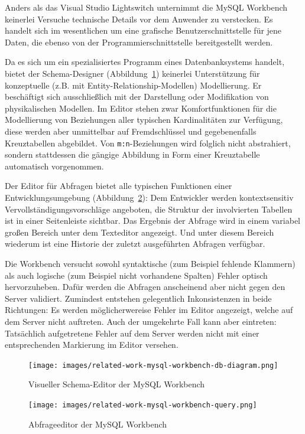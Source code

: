 Anders als das Visual Studio Lightswitch unternimmt die MySQL Workbench keinerlei Versuche technische Details vor dem Anwender zu verstecken. Es handelt sich im wesentlichen um eine grafische Benutzerschnittstelle für jene Daten, die ebenso von der Programmierschnittstelle bereitgestellt werden.

Da es sich um ein spezialisiertes Programm eines Datenbanksystems handelt, bietet der Schema-Designer (Abbildung~\ref{fig:mysql-workbench-schema-diagram}) keinerlei Unterstützung für konzeptuelle (z.B. mit Entity-Relationship-Modellen) Modellierung. Er beschäftigt sich ausschließlich mit der Darstellung oder Modifikation von physikalischen Modellen. Im Editor stehen zwar Komfortfunktionen für die Modellierung von Beziehungen aller typischen Kardinalitäten zur Verfügung, diese werden aber unmittelbar auf Fremdschlüssel und gegebenenfalls Kreuztabellen abgebildet. Von \texttt{m:n}-Beziehungen wird folglich nicht abstrahiert, sondern stattdessen die gängige Abbildung in Form einer Kreuztabelle automatisch vorgenommen.

Der Editor für Abfragen bietet alle typischen Funktionen einer Entwicklungsumgebung (Abbildung~\ref{fig:mysql-workbench-query}): Dem Entwickler werden kontextsensitiv Vervollständigungsvorschläge angeboten, die Struktur der involvierten Tabellen ist in einer Seitenleiste sichtbar. Das Ergebnis der Abfrage wird in einem variabel großen Bereich unter dem Texteditor angezeigt. Und unter diesem Bereich wiederum ist eine Historie der zuletzt ausgeführten Abfragen verfügbar.

Die Workbench versucht sowohl syntaktische (zum Beispiel fehlende Klammern) als auch logische (zum Beispiel nicht vorhandene Spalten) Fehler optisch hervorzuheben. Dafür werden die Abfragen anscheinend aber nicht gegen den Server validiert. Zumindest entstehen gelegentlich Inkonsistenzen in beide Richtungen: Es werden möglicherwereise Fehler im Editor angezeigt, welche auf dem Server nicht auftreten. Auch der umgekehrte Fall kann aber eintreten: Tatsächlich aufgetretene Fehler auf dem Server werden nicht mit einer entsprechenden Markierung im Editor versehen.

\begin{figure}[p]
  \centering \texttt{[image: images/related-work-mysql-workbench-db-diagram.png]}
  \caption{Visueller Schema-Editor der MySQL Workbench}
  \label{fig:mysql-workbench-schema-diagram}
\end{figure}

\begin{figure}[p]
  \centering \texttt{[image: images/related-work-mysql-workbench-query.png]}
  \caption{Abfrageeditor der MySQL Workbench}
  \label{fig:mysql-workbench-query}
\end{figure}

